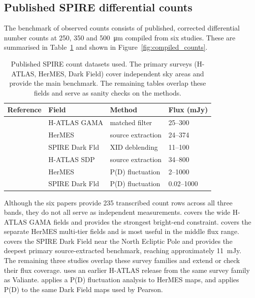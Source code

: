 \documentclass[12pt,a4paper]{article}
\begin{document}
\subsection{Published SPIRE differential counts}
\label{sec:data:counts}

The benchmark of observed counts consists of published, corrected differential
number counts at 250, 350 and \SI{500}{\um} compiled from six studies. These are
summarised in Table~\ref{tab:counts} and shown in Figure~\ref{fig:compiled_counts}.

\begin{table}[H]
\centering
\caption{Published SPIRE count datasets used. The primary surveys
(H-ATLAS, HerMES, Dark Field) cover independent sky areas and provide the main benchmark. The remaining tables overlap these fields and serve as
sanity checks on the methods.}
\label{tab:counts}
\footnotesize
\setlength{\tabcolsep}{4pt}
\begin{tabular}{@{}llll@{}}
\toprule
Reference & Field & Method & Flux (mJy)  \\
\midrule
\citet{Valiante_2016} & H-ATLAS GAMA   & matched filter    & 25--300   \\
\citet{Oliver_2010}   & HerMES         & source extraction & 24--374   \\
\citet{Pearson_2025}  & SPIRE Dark Fld & XID deblending    & 11--100   \\
\midrule
\citet{Clements_2010} & H-ATLAS SDP    & source extraction & 34--800  \\
\citet{Glenn_2010}    & HerMES         & P(D) fluctuation  & 2--1000  \\
\citet{Varnish_2025}  & SPIRE Dark Fld & P(D) fluctuation  & 0.02--1000 \\
\bottomrule
\end{tabular}
\end{table}

Although the six papers provide 235 transcribed count rows across all three bands, they
do not all serve as independent measurements. \citet{Valiante_2016} covers the wide H-ATLAS GAMA
fields and provides the strongest bright-end constraint. \citet{Oliver_2010} covers the
separate HerMES multi-tier fields and is most useful in the middle flux range.
\citet{Pearson_2025} covers the SPIRE Dark Field near the North Ecliptic Pole and
provides the deepest primary source-extracted benchmark, reaching approximately
\SI{11}{mJy}. The remaining three studies overlap these survey families and extend or
check their flux coverage. \citet{Clements_2010} uses an earlier H-ATLAS release from
the same survey family as Valiante. \citet{Glenn_2010} applies a P(D) fluctuation analysis to HerMES maps, and
\citet{Varnish_2025} applies P(D) to the same Dark Field maps used by Pearson.
\end{document}
